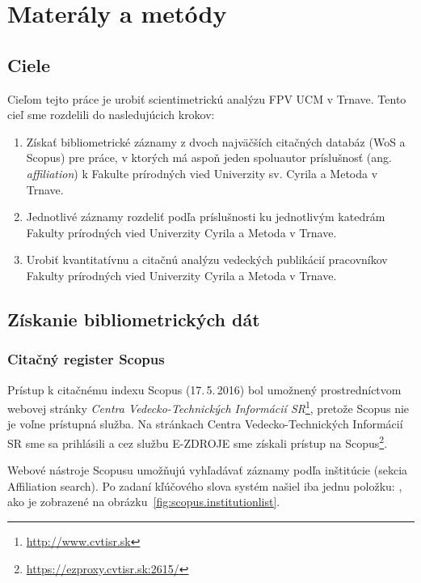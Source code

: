 \chapter{Materály a metódy}

\section{Ciele}

Cieľom tejto práce je urobiť scientimetrickú analýzu FPV UCM v Trnave.  Tento
cieľ sme rozdelili do nasledujúcich krokov:

\begin{enumerate}

\item Získať bibliometrické záznamy z dvoch najväčších citačných databáz (WoS a
  Scopus) pre práce, v ktorých má aspoň jeden spoluautor príslušnosť
  (ang.\,\emph{affiliation}) k Fakulte prírodných vied Univerzity sv. Cyrila a
  Metoda v Trnave.

\item Jednotlivé záznamy rozdeliť podľa príslušnosti ku jednotlivým katedrám
  Fakulty prírodných vied Univerzity Cyrila a Metoda v Trnave.

\item Urobiť kvantitatívnu a citačnú analýzu vedeckých publikácií pracovníkov
  Fakulty prírodných vied Univerzity Cyrila a Metoda v Trnave.

\end{enumerate}


\section{Získanie bibliometrických dát}

\subsection{Citačný register Scopus}

Prístup k citačnému indexu Scopus (17.\,5.\,2016) bol umožnený prostredníctvom
webovej stránky \emph{Centra Vedecko-Technických Informácií
  SR}\footnote{\url{http://www.cvtisr.sk}}, pretože Scopus nie je voľne
prístupná služba.  Na stránkach Centra Vedecko-Technických Informácií SR sme sa
prihlásili a cez službu E-ZDROJE sme získali prístup na
Scopus\footnote{\url{https://ezproxy.cvtisr.sk:2615/}}.

Webové nástroje Scopusu umožňujú vyhľadávať záznamy podľa inštitúcie (sekcia
Affiliation search).  Po zadaní kľúčového slova  systém našiel iba
jednu položku: , ako je
zobrazené na obrázku~\ref{fig:scopus.institutionlist}.

